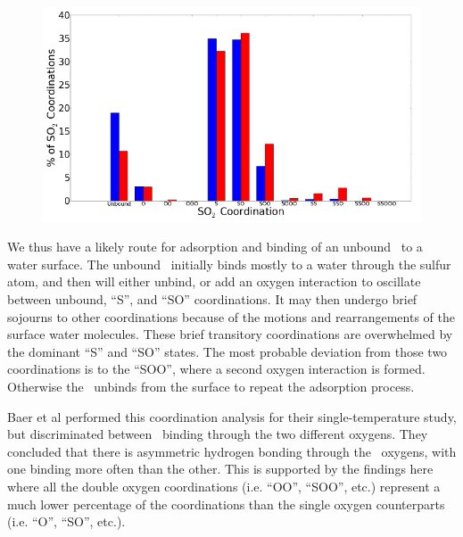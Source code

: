 \begin{figure}[h!]
	\begin{center}
		\includegraphics[scale=1.0]{images/coordinations/so2-coordinations-percents-small.png}
		\caption{}
		\label{fig:bonding-coordinations}
	\end{center}
\end{figure}

We thus have a likely route for adsorption and binding of an unbound \suldiox~to a water surface. The unbound \suldiox~initially binds mostly to a water through the sulfur atom, and then will either unbind, or add an oxygen interaction to oscillate between unbound, ``S'', and ``SO'' coordinations. It may then undergo brief sojourns to other coordinations because of the motions and rearrangements of the surface water molecules. These brief transitory coordinations are overwhelmed by the dominant ``S'' and ``SO'' states. The most probable deviation from those two coordinations is to the ``SOO'', where a second oxygen interaction is formed. Otherwise the \suldiox~unbinds from the surface to repeat the adsorption process.

Baer et al performed this coordination analysis for their single-temperature study, but discriminated between \suldiox~binding through the two different oxygens. They concluded that there is asymmetric hydrogen bonding through the \suldiox~oxygens, with one binding more often than the other. This is supported by the findings here where all the double oxygen coordinations (i.e. ``OO'', ``SOO'', etc.) represent a much lower percentage of the coordinations than the single oxygen counterparts (i.e. ``O'', ``SO'', etc.). 



